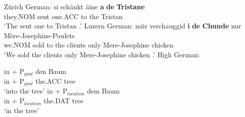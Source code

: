 \begin{exe}
	 Zürich German:
		\gll si schänkt äine \textbf{a} \textbf{de} \textbf{Tristane}\\
		they.NOM sent one.ACC to the Tristan\\
		\trans `The sent one to Tristan \citep[pg. 175]{Seiler.2003}.'
	 Luzern German:
		\gll miir verchauggid \textbf{i} \textbf{de} \textbf{Chunde} nur Mère-Josephine-Poulets\\
		we.NOM sold to the clients only Mere-Josephine chicken\\
		`We sold the clients only Mere-Josephine chicken \citep[pg. 175]{Seiler.2003}.'
	 High German:
		\begin{xlist}
			\ex \gll in + P$_{goal}$ den Baum\\
				 in + P$_{goal}$ the.ACC tree\\
				 \trans `into the tree'
			\ex \gll in + P$_{location}$ dem Baum\\
				 in + P$_{location}$ the.DAT tree\\
				 \trans `in the tree'
		\end{xlist}

\end{exe}
